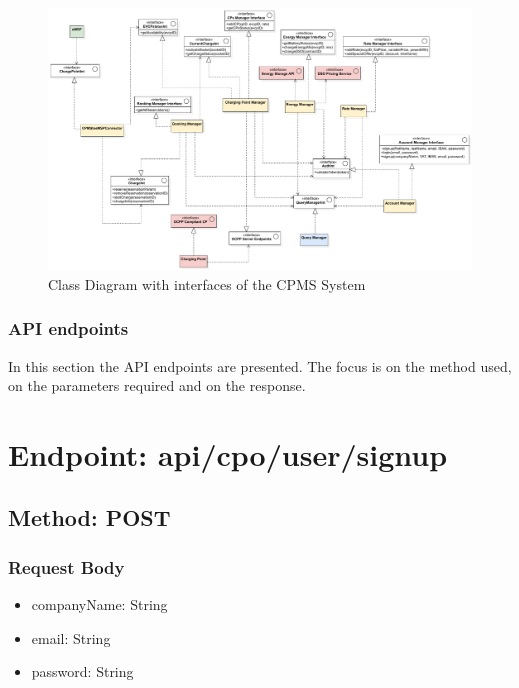 \begin{figure}[H]
    \centering
    \hspace*{-2.5cm}
    \includegraphics[scale=0.5]{src/componentInterfaces/cpms_interface.pdf}
    \caption{Class Diagram with interfaces of the CPMS System}
\end{figure}

\subsubsection{API endpoints}
In this section the API endpoints are presented. The focus is on the method used, on the parameters required and on the response.

\section*{Endpoint: api/cpo/user/signup}
\subsection*{Method: POST}
\subsubsection*{Request Body}
\begin{itemize}
    \item companyName: String
    \item email: String
    \item password: String
\end{itemize}
